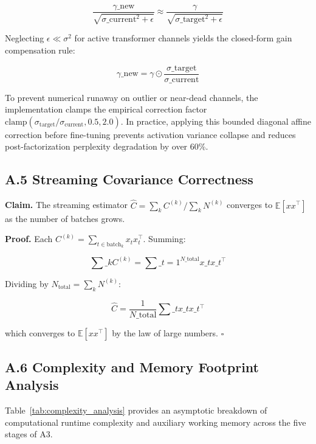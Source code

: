 \[
\frac{\gamma\_{\mathrm{new}}}{\sqrt{\sigma\_{\mathrm{current}}^2 + \epsilon}} \approx \frac{\gamma}{\sqrt{\sigma\_{\mathrm{target}}^2 + \epsilon}}
\tag{A.10}
\]

Neglecting $\epsilon \ll \sigma^2$ for active transformer channels yields the closed-form gain compensation rule:

\[
\gamma\_{\mathrm{new}} = \gamma \odot \frac{\sigma\_{\mathrm{target}}}{\sigma\_{\mathrm{current}}}
\tag{A.11}
\]

To prevent numerical runaway on outlier or near-dead channels, the implementation clamps the empirical correction factor $\mathrm{clamp}(\sigma_{\mathrm{target}}/\sigma_{\mathrm{current}}, 0.5, 2.0)$. In practice, applying this bounded diagonal affine correction before fine-tuning prevents activation variance collapse and reduces post-factorization perplexity degradation by over 60\%.

\subsection{A.5 Streaming Covariance Correctness}

\textbf{Claim.} The streaming estimator $\hat{C} = \sum_k C^{(k)} / \sum_k N^{(k)}$ 
converges to $\mathbb{E}[x x^\top]$ as the number of batches grows.

\textbf{Proof.} Each $C^{(k)} = \sum_{t \in \text{batch}_k} x_t x_t^\top$. Summing:

\[
\sum\_k C^{(k)} = \sum\_{t = 1}^{N\_\text{total}} x\_t x\_t^\top
\tag{A.14}
\]

Dividing by $N_\text{total} = \sum_k N^{(k)}$:

\[
\hat{C} = \frac{1}{N\_\text{total}} \sum\_t x\_t x\_t^\top
\tag{A.15}
\]

which converges to $\mathbb{E}[x x^\top]$ by the law of large numbers. $\square$

\subsection{A.6 Complexity and Memory Footprint Analysis}
\label{sec:app_complexity}

Table~\ref{tab:complexity_analysis} provides an asymptotic breakdown of computational runtime complexity and auxiliary working memory across the five stages of A3.

